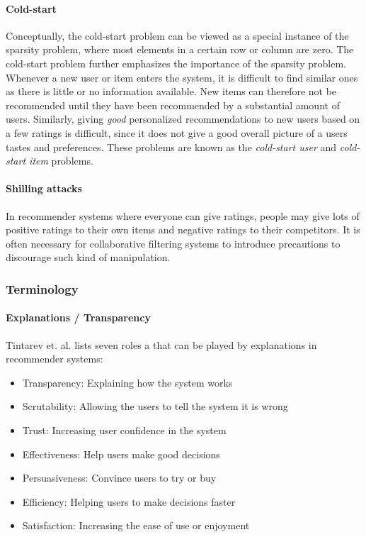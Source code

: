 \paragraph{Cold-start}

Conceptually, the cold-start problem can be viewed as a special instance of the
sparsity problem, where most elements in a certain row or column are zero. The
cold-start problem further emphasizes the importance of the sparsity problem.
Whenever a new user or item enters the system, it is difficult to find similar
ones as there is little or no information available. New items can therefore
not be recommended until they have been recommended by a substantial amount of
users. Similarly, giving \emph{good} personalized recommendations to new users
based on a few ratings is difficult, since it does not give a good overall
picture of a users tastes and preferences. These problems are known as the
\emph{cold-start user} and \emph{cold-start item} problems.

\paragraph{Shilling attacks}

In recommender systems where everyone can give ratings, people may give lots of
positive ratings to their own items and negative ratings to their competitors.
It is often necessary for collaborative filtering systems to introduce
precautions to discourage such kind of manipulation.

\subsubsection{Terminology}


\paragraph{Explanations / Transparency}

Tintarev et. al. \cite{Tintarev2007} lists seven roles a that can be played by explanations in recommender systems:

\begin{itemize}
\item Transparency: Explaining how the system works
\item Scrutability: Allowing the users to tell the system it is wrong
\item Trust: Increasing user confidence in the system
\item Effectiveness: Help users make good decisions
\item Persuasiveness: Convince users to try or buy
\item Efficiency: Helping users to make decisions faster
\item Satisfaction: Increasing the ease of use or enjoyment
\end{itemize}

